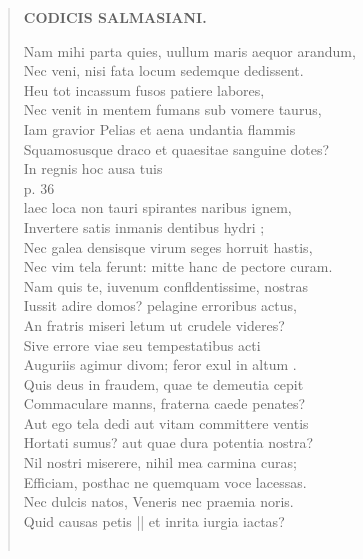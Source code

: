 \documentclass[11pt, a4paper]{report}
\begin{document}
\begin{verse}
    \begin{center} \textbf{CODICIS SALMASIANI.} \end{center} \marginpar{[71]} Nam mihi parta quies, uullum maris aequor arandum, \\ Nec veni, nisi fata locum sedemque dedissent. \\ Heu tot incassum fusos patiere labores, \\ Nec venit in mentem fumans sub vomere taurus, \\ Iam gravior Pelias et aena undantia flammis \\ Squamosusque draco et quaesitae sanguine dotes? \\ In regnis hoc ausa tuis \\ p. 36 \\ laec loca non tauri spirantes naribus ignem, \\  \lbrack Invertere satis inmanis dentibus hydri \rbrack ; \\ Nec galea densisque virum seges horruit hastis, \\ Nec vim tela ferunt: mitte hanc de pectore curam. \\ Nam quis te, iuvenum confldentissime, nostras \\ Iussit adire domos? pelagine erroribus actus, \\ An fratris miseri letum ut crudele videres? \\ Sive errore viae seu tempestatibus acti \\  \lbrack Auguriis agimur divom; feror exul in altum \rbrack . \\ Quis deus in fraudem, quae  \lbrack te \rbrack  demeutia cepit \\ Commaculare manns, fraterna caede penates? \\ Aut ego tela dedi aut vitam committere ventis \\ Hortati sumus?  \lbrack aut quae dura potentia nostra? \\ Nil nostri miserere, nihil mea carmina curas; \\ Efficiam, posthac ne quemquam voce lacessas. \\ Nec dulcis natos, Veneris nec praemia noris. \\ Quid causas petis || et inrita iurgia iactas? \\ 
        ﻿\pagebreak 

\end{verse}
\end{document}
